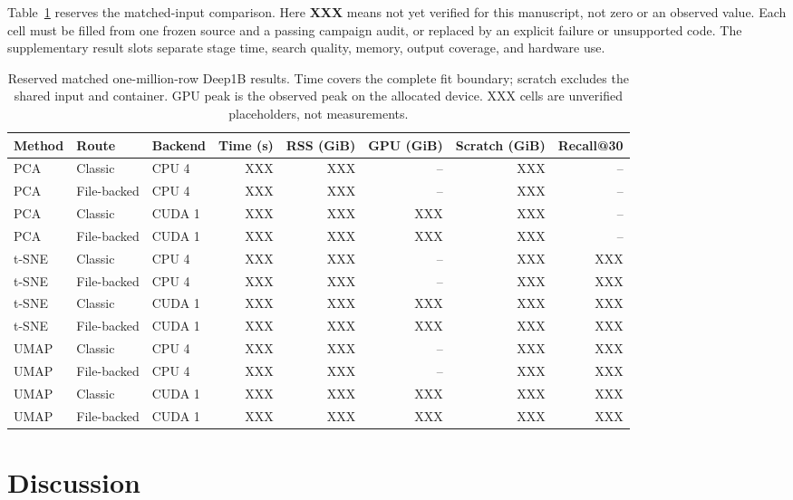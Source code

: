 \documentclass[article]{jss}
\begin{document}
Table~\ref{tab:pending-deep-main} reserves the matched-input comparison.
Here \textbf{XXX} means not yet verified for this manuscript, not zero or
an observed value. Each cell must be filled from one frozen source and a
passing campaign audit, or replaced by an explicit failure or unsupported
code. The supplementary result slots separate stage time, search quality,
memory, output coverage, and hardware use.

\begin{table}[htbp]
\centering
\scriptsize
\caption{Reserved matched one-million-row Deep1B results. Time covers the
  complete fit boundary; scratch excludes the shared input and container.
  GPU peak is the observed peak on the allocated device. XXX cells are
  unverified placeholders, not measurements.}
\label{tab:pending-deep-main}
\begin{tabular}{lllrrrrr}
\toprule
Method & Route & Backend & Time (s) & RSS (GiB) & GPU (GiB) &
  Scratch (GiB) & Recall@30 \\
\midrule
PCA & Classic & CPU 4 & XXX & XXX & -- & XXX & -- \\
PCA & File-backed & CPU 4 & XXX & XXX & -- & XXX & -- \\
PCA & Classic & CUDA 1 & XXX & XXX & XXX & XXX & -- \\
PCA & File-backed & CUDA 1 & XXX & XXX & XXX & XXX & -- \\
t-SNE & Classic & CPU 4 & XXX & XXX & -- & XXX & XXX \\
t-SNE & File-backed & CPU 4 & XXX & XXX & -- & XXX & XXX \\
t-SNE & Classic & CUDA 1 & XXX & XXX & XXX & XXX & XXX \\
t-SNE & File-backed & CUDA 1 & XXX & XXX & XXX & XXX & XXX \\
UMAP & Classic & CPU 4 & XXX & XXX & -- & XXX & XXX \\
UMAP & File-backed & CPU 4 & XXX & XXX & -- & XXX & XXX \\
UMAP & Classic & CUDA 1 & XXX & XXX & XXX & XXX & XXX \\
UMAP & File-backed & CUDA 1 & XXX & XXX & XXX & XXX & XXX \\
\bottomrule
\end{tabular}
\end{table}

\section{Discussion}
\end{document}
